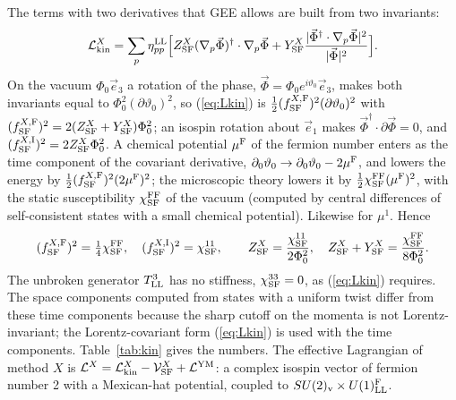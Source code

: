 \documentclass[aps,prd,onecolumn,superscriptaddress,nofootinbib,floatfix,longbibliography]{revtex4-2}
\newcommand{\LL}{{\rm LL}}
\newcommand{\SF}{{\rm SF}}
\begin{document}
The terms with two derivatives that GEE allows are built from two invariants:
\begin{equation}
\mathcal L^X_{\rm kin}=\sum_p\eta^\LL_{pp}\Big[Z^X_\SF(\nabla_p\vec\Phi)^\dagger\cdot\nabla_p\vec\Phi+Y^X_\SF\frac{|\vec\Phi^\dagger\cdot\nabla_p\vec\Phi|^2}{|\vec\Phi|^2}\Big].
\label{eq:Lkin}
\end{equation}
On the vacuum $\Phi_0\vec e_3$ a rotation of the phase, $\vec\Phi=\Phi_0e^{i\vartheta_0}\vec e_3$, makes both invariants equal to
$\Phi_0^2(\partial\vartheta_0)^2$, so (\ref{eq:Lkin}) is $\frac12(f^{X,{\rm F}}_\SF)^2(\partial\vartheta_0)^2$ with
$(f^{X,{\rm F}}_\SF)^2=2(Z^X_\SF+Y^X_\SF)\Phi_0^2$; an isospin rotation about $\vec e_1$ makes $\vec\Phi^\dagger\cdot\partial\vec\Phi=0$, and
$(f^{X,{\rm I}}_\SF)^2=2Z^X_\SF\Phi_0^2$. A chemical potential $\mu^{\rm F}$ of the fermion number enters as the time component of the
covariant derivative, $\partial_0\vartheta_0\to\partial_0\vartheta_0-2\mu^{\rm F}$, and lowers the energy by
$\frac12(f^{X,{\rm F}}_\SF)^2(2\mu^{\rm F})^2$; the microscopic theory lowers it by $\frac12\chi^{\rm FF}_\SF(\mu^{\rm F})^2$, with the static
susceptibility $\chi^{\rm FF}_\SF$ of the vacuum (computed by central differences of self-consistent states with a small chemical
potential). Likewise for $\mu^1$. Hence
\begin{equation}
(f^{X,{\rm F}}_\SF)^2=\tfrac14\chi^{\rm FF}_\SF,\quad(f^{X,{\rm I}}_\SF)^2=\chi^{11}_\SF,\qquad Z^X_\SF=\frac{\chi^{11}_\SF}{2\Phi_0^2},\quad Z^X_\SF+Y^X_\SF=\frac{\chi^{\rm FF}_\SF}{8\Phi_0^2}.
\label{eq:ZY}
\end{equation}
The unbroken generator $T^3_\LL$ has no stiffness, $\chi^{33}_\SF=0$, as (\ref{eq:Lkin}) requires. The space components
computed from states with a uniform twist differ from these time components because the sharp cutoff on the momenta is not
Lorentz-invariant; the Lorentz-covariant form (\ref{eq:Lkin}) is used with the time components. Table~\ref{tab:kin} gives the
numbers. The effective Lagrangian of method $X$ is $\mathcal L^X=\mathcal L^X_{\rm kin}-\mathcal V^X_\SF+\mathcal L^{\rm YM}$: a complex
isospin vector of fermion number 2 with a Mexican-hat potential, coupled to $SU(2)_{\rm v}\times U(1)^{\rm F}_\LL$.
\end{document}
